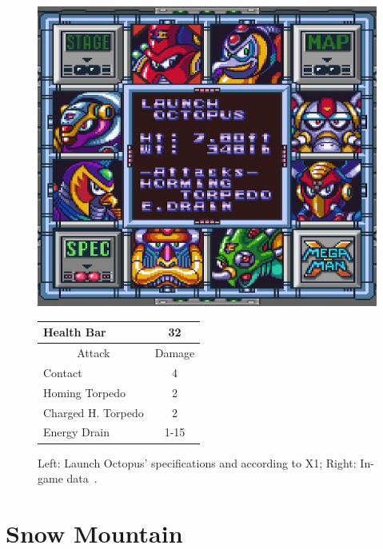 \begin{figure}[htp]
	\begin{minipage}[c]{0.45\linewidth}
		\vspace{0pt}
		\centering
		\includegraphics[width=\linewidth]{figures/X1/Launch_octopus/Launch_octopus_specs.png}
	\end{minipage}
	\begin{minipage}[c]{0.45\linewidth}
		\centering
		\vspace{0pt}
		\begin{tabular}[h]{l c}
			\toprule
			Health Bar & 32\\
			\midrule
			\multicolumn{1}{c}{Attack} & \multicolumn{1}{c}{Damage}\\
			Contact & 4\\
			Homing Torpedo & 2\\
			Charged H. Torpedo & 2\\
			Energy Drain & 1-15\\
			\bottomrule
		\end{tabular}
	\end{minipage}
	\caption{Left: Launch Octopus' specifications and according to X1; Right: In-game data~\cite{wiki:Launch_octopus}. }
	\label{Octopus_specs}
\end{figure}


\section{Snow Mountain}

